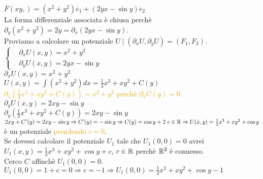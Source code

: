 \begin{exbar}
\begin{example}
	$\overline{F}(xy,)=(x^2+y^2)\overline{e}_1+(2yx-\sin y)\overline{e}_2$\\
	La forma differenziale associata è chiusa perchè $\partial_y(x^2+y^2)=2y=\partial_x(2yx-\sin y)$.\\
	Proviamo a calcolare un potenziale $U\mid(\partial_xU,\partial_yU)=(F_1,F_2)$.\\
	$\begin{cases}
		&\partial_x U(x,y)=x^2+y^2\\
		&\partial_y U(x,y)=2yx-\sin y
	\end{cases}$\\
	$\partial_xU(x,y)=x^2+y^2$\\
	$U(x,y)= \int (x^2+y^2)dx= \frac{1}{3}x^3+xy^2+C(y)$\\
	\textcolor{orange}{$\partial_x\left(\frac{1}{3} x^3+xy^2+C(y)\right)=x^2+y^2$ perchè $\partial_xC(y)=0$.}\\
	$\partial_yU(x,y)=2xy-\sin y$\\
	$\partial_y \left( \frac{1}{3}x^3+xy^2+C(y) \right)=2xy-\sin y$\\
	$2xy+C'(y)=2xy-\sin y \Rightarrow C'(y)=-\sin y \Rightarrow C(y)=\cos y + 2\,\,c \in \mathbb{R} \Rightarrow U(x,y)=\frac{1}{3}x^3+xy^2+\cos y$ è un potenziale \textcolor{orange}{prendendo $c=0$}.\\
	Se dovessi calcolare il potenziale $U_1$ tale che $U_1(0,0)=0$ avrei $U_1(x,y)=\frac{1}{3}x^3+xy^2+\cos y +c$, $c \in \mathbb{R}$ perchè $\mathbb{R}^2$ è connesso.\\
	Cerco $C$ affinchè $U_1(0,0)=0$.\\
	$U_1(0,0)=1+c=0\Rightarrow c=-1\Rightarrow U_1(0,0)=\frac{1}{3}x^3+xy^2+\cos y -1$
\end{example}
\end{exbar}


